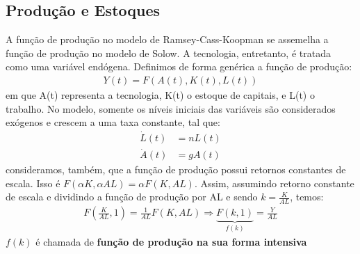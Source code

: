 \documentclass[11pt,a4paper]{article}
\begin{document}
\subsection{Produção e Estoques}

A função de produção no modelo de Ramsey-Cass-Koopman se assemelha a função de produção no modelo de Solow. A tecnologia, entretanto, é tratada como uma variável endógena. Definimos de forma genérica a função de produção:
\begin{align*}
Y(t) = F(A(t), K(t), L(t))
\end{align*}
\noindent
em que A(t) representa a tecnologia, K(t) o estoque de capitais, e L(t) o trabalho. No modelo, somente os níveis iniciais das variáveis são considerados exógenos e crescem a uma taxa constante, tal que:
\begin{align*}
\dot{L}(t) &= nL(t) \\
\dot{A}(t) &= gA(t)
\end{align*} 
\noindent
consideramos, também, que a função de produção possui retornos constantes de escala. Isso é $F(\alpha K, \alpha AL)= \alpha F(K,AL)$. Assim, assumindo retorno constante de escala e dividindo a função de produção por AL e sendo $k = \frac{K}{AL}$, temos:
\begin{align*}
F\left(\frac{K}{AL}, 1\right) = \frac{1}{AL}F(K, AL) \Rightarrow \underbrace{F(k, 1)}_{f(k)} = \frac{Y}{AL}
\end{align*}
\noindent
$f(k)$ é chamada de \textbf{função de produção na sua forma intensiva}
\end{document}
